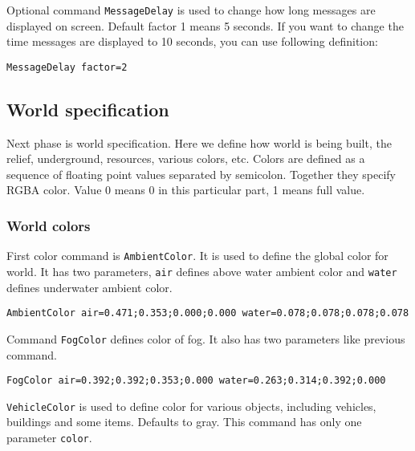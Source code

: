 Optional command \texttt{MessageDelay} is used to change how long messages are displayed on screen. Default factor 1 means 5 seconds. If you want to change the time messages are displayed to 10 seconds, you can use following definition:

\begin{lstlisting}[style=scene]
MessageDelay factor=2
\end{lstlisting}


\subsection{World specification}

Next phase is world specification. Here we define how world is being built, the relief, underground, resources, various colors, etc. Colors are defined as a sequence of floating point values separated by semicolon. Together they specify RGBA color. Value 0 means 0 in this particular part, 1 means full value.



\subsubsection{World colors}

First color command is \verb|AmbientColor|. It is used to define the global color for world. It has two parameters, \verb|air| defines above water ambient color and \verb|water| defines underwater ambient color.

\begin{lstlisting}[style=scene]
AmbientColor air=0.471;0.353;0.000;0.000 water=0.078;0.078;0.078;0.078
\end{lstlisting}


Command \verb|FogColor| defines color of fog. It also has two parameters like previous command.

\begin{lstlisting}[style=scene]
FogColor air=0.392;0.392;0.353;0.000 water=0.263;0.314;0.392;0.000
\end{lstlisting}

\verb|VehicleColor| is used to define color for various objects, including vehicles, buildings and some items. Defaults to gray. This command has only one parameter \verb|color|.

